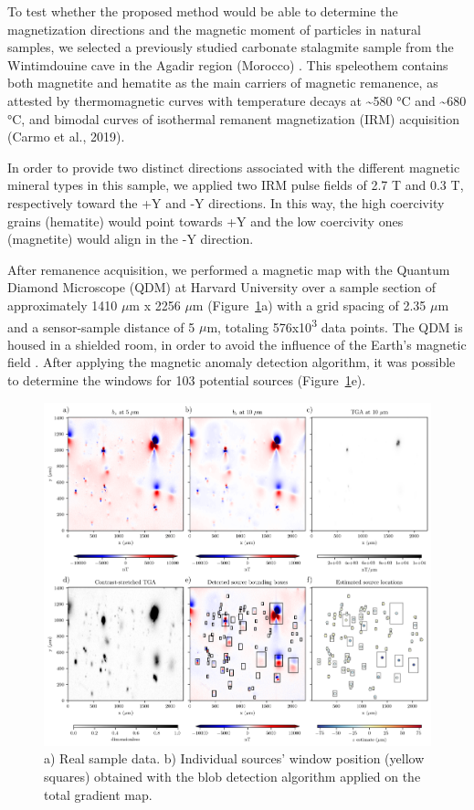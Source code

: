To test whether the proposed method would be able to determine the
magnetization directions and the magnetic moment of particles in natural
samples, we selected a previously studied carbonate stalagmite sample from the
Wintimdouine cave in the Agadir region (Morocco) \citep{Ait2019Hydro}. This
speleothem contains both magnetite and hematite as the main carriers of
magnetic remanence, as attested by thermomagnetic curves with temperature
decays at {\textasciitilde}580 °C and {\textasciitilde}680 °C, and bimodal
curves of isothermal remanent magnetization (IRM) acquisition (Carmo et al.,
2019).

In order to provide two distinct directions associated with the different
magnetic mineral types in this sample, we applied two IRM pulse fields of 2.7 T
and 0.3 T, respectively toward the +Y and -Y directions. In this way, the high
coercivity grains (hematite) would point towards +Y and the low coercivity ones
(magnetite) would align in the -Y direction.

After remanence acquisition, we performed a magnetic map with the Quantum
Diamond Microscope (QDM) at Harvard University over a sample section of
approximately 1410 $\mu$m x 2256 $\mu$m (Figure~\ref{real-data}a) with a grid
spacing of 2.35 $\mu$m and a sensor-sample distance of 5 $\mu$m, totaling
576x10\textsuperscript{3} data points. The QDM is housed in a shielded room, in
order to avoid the influence of the Earth's magnetic field \citep{Fu2020,
Glenn2017}. After applying the magnetic anomaly detection algorithm, it was
possible to determine the windows for 103 potential sources
(Figure~\ref{real-data}e).

\begin{figure}[tb]
\centering
\includegraphics[width=1\linewidth]{figures/real-data.png}
\caption{
a) Real sample data. b) Individual sources' window position (yellow squares)
obtained with the blob detection algorithm applied on the total gradient map.
}
\label{real-data}
\end{figure}


